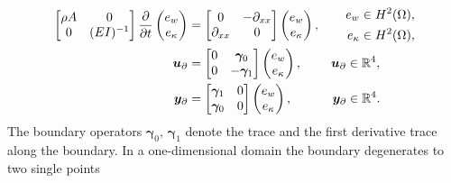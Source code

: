 \begin{subequations}\label{eq:pHlinsys_EB1}
\begin{align}
\begin{bmatrix}
\rho A & 0 \\
0 &(EI)^{-1} \\
\end{bmatrix}
\diffp{}{t}\begin{pmatrix}
e_w \\ e_\kappa \\
\end{pmatrix} &= \begin{bmatrix}
0 & -\partial_{xx} \\
\partial_{xx} & 0 \\
\end{bmatrix} \begin{pmatrix}
e_w \\ e_\kappa \\
\end{pmatrix}, \qquad \begin{aligned}
e_w \in H^2(\Omega), \\
e_\kappa \in H^2(\Omega), \\
\end{aligned} \label{eq:pHdyn_EB1}\\
\bm{u}_\partial &= \begin{bmatrix}
0 &\bm\gamma_{0} \\
0 &-\bm\gamma_{1} 
\end{bmatrix} \begin{pmatrix}
e_w \\ e_\kappa \\
\end{pmatrix}, \qquad \; \bm{u}_\partial \in \mathbb{R}^4,  \\
\bm{y}_\partial &= \begin{bmatrix}
\bm\gamma_{1} & 0\\
\bm\gamma_{0} & 0 
\end{bmatrix} \begin{pmatrix}
e_w \\ e_\kappa \\
\end{pmatrix}, \qquad \quad \, \bm{y}_\partial \in \mathbb{R}^4.
\end{align}
\end{subequations}
The boundary operators $\bm\gamma_0, \, \bm\gamma_{1}$ denote the trace and the first derivative trace along the boundary. In a one-dimensional domain the boundary degenerates to two single points

